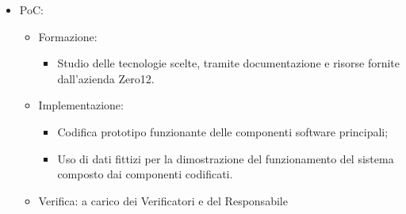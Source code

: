 {{\begin{itemize}
\begin{itemize}
                \item scelta delle tecnologie: rapido resoconto delle tecnologie testate con motivazione della scelta delle stesse, svolto dai Progettisti;
                \item progettazione PoC: descrizione generale del PoC, svolto dai progettisti;
                \item verifica e approvazione: a carico dei Verificatori e del Responsabile.
            \end{itemize}
        \item PoC: 
            \begin{itemize}
                \item Formazione: 
                    \begin{itemize}
                        \item Studio delle tecnologie scelte, tramite documentazione e risorse fornite dall'azienda Zero12.
                    \end{itemize}
                \item Implementazione: 
                    \begin{itemize}
                        \item Codifica prototipo funzionante delle componenti software principali;
                        \item Uso di dati fittizi per la dimostrazione del funzionamento del sistema composto dai componenti codificati.
                    \end{itemize}
                \item Verifica: a carico dei Verificatori e del Responsabile
            \end{itemize}
    \end{itemize}
    
}}
